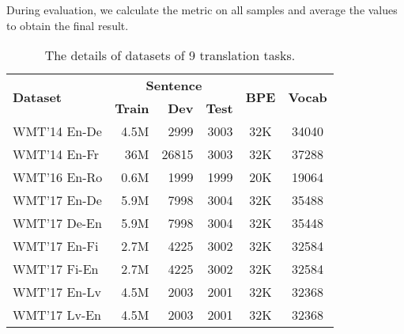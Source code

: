 \documentclass[11pt]{article}
\begin{document}
    
During evaluation, we calculate the metric on all samples and average the values to obtain the final result.






\begin{table}[ht!]
\centering
\setlength{\tabcolsep}{1.5pt}
\begin{tabular}{lrrrcc}
\toprule
\multirow{2}{*}{\textbf{Dataset}}& \multicolumn{3}{c}{\textbf{Sentence}}& \multirow{2}{*}{\textbf{BPE}} & \multirow{2}{*}{\textbf{Vocab}}  \\
\cmidrule{2-4}
& \textbf{Train} & \textbf{Dev} & \textbf{Test} &  &  \\
\midrule
WMT'14 En-De & 4.5M&2999&3003 & 32K & 34040\\
WMT'14 En-Fr & 36M&26815&3003 & 32K & 37288\\
WMT'16 En-Ro  & 0.6M&1999& 1999 &  20K&  19064\\
WMT'17 En-De & 5.9M&7998&3004 & 32K & 35488\\
WMT'17 De-En & 5.9M&7998&3004 & 32K & 35448\\
WMT'17 En-Fi  & 2.7M&4225& 3002 &  32K&  32584\\
WMT'17 Fi-En  & 2.7M&4225& 3002 &  32K&  32584\\
WMT'17 En-Lv  & 4.5M&2003& 2001 &  32K&  32368\\
WMT'17 Lv-En  & 4.5M&2003& 2001 &  32K&  32368\\
\bottomrule
\end{tabular}
\caption{The details of datasets of 9 translation tasks.}
\label{tab:dataset_deatails}
\end{table}
\end{document}
